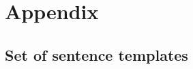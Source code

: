 


\appendix
\chapter{Appendix}\label{c.appendix}

\section{Set of sentence templates}\label{c.appendix.sentencetemplates}


